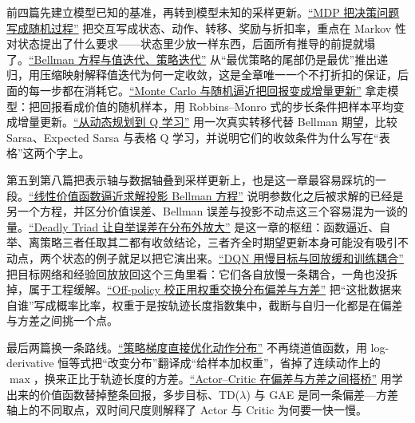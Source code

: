 前四篇先建立模型已知的基准，再转到模型未知的采样更新。\hyperref[sec:16-Control-and-Reinforcement-Learning/02-Reinforcement-Learning/01]{``MDP 把决策问题写成随机过程''} 把交互写成状态、动作、转移、奖励与折扣率，重点在 Markov 性对状态提出了什么要求——状态里少放一样东西，后面所有推导的前提就塌了。\hyperref[sec:16-Control-and-Reinforcement-Learning/02-Reinforcement-Learning/02]{``Bellman 方程与值迭代、策略迭代''} 从``最优策略的尾部仍是最优''推出递归，用压缩映射解释值迭代为何一定收敛，这是全章唯一一个不打折扣的保证，后面的每一步都在消耗它。\hyperref[sec:16-Control-and-Reinforcement-Learning/02-Reinforcement-Learning/03]{``Monte Carlo 与随机逼近把回报变成增量更新''} 拿走模型：把回报看成价值的随机样本，用 Robbins--Monro 式的步长条件把样本平均变成增量更新。\hyperref[sec:16-Control-and-Reinforcement-Learning/02-Reinforcement-Learning/04]{``从动态规划到 Q 学习''} 用一次真实转移代替 Bellman 期望，比较 Sarsa、Expected Sarsa 与表格 Q 学习，并说明它们的收敛条件为什么写在``表格''这两个字上。

第五到第八篇把表示轴与数据轴叠到采样更新上，也是这一章最容易踩坑的一段。\hyperref[sec:16-Control-and-Reinforcement-Learning/02-Reinforcement-Learning/05]{``线性价值函数逼近求解投影 Bellman 方程''} 说明参数化之后被求解的已经是另一个方程，并区分价值误差、Bellman 误差与投影不动点这三个容易混为一谈的量。\hyperref[sec:16-Control-and-Reinforcement-Learning/02-Reinforcement-Learning/06]{``Deadly Triad 让自举误差在分布外放大''} 是这一章的枢纽：函数逼近、自举、离策略三者任取其二都有收敛结论，三者齐全时期望更新本身可能没有吸引不动点，两个状态的例子就足以把它演出来。\hyperref[sec:16-Control-and-Reinforcement-Learning/02-Reinforcement-Learning/07]{``DQN 用慢目标与回放缓和训练耦合''} 把目标网络和经验回放放回这个三角里看：它们各自放慢一条耦合，一角也没拆掉，属于工程缓解。\hyperref[sec:16-Control-and-Reinforcement-Learning/02-Reinforcement-Learning/08]{``Off-policy 校正用权重交换分布偏差与方差''} 把``这批数据来自谁''写成概率比率，权重于是按轨迹长度指数集中，截断与自归一化都是在偏差与方差之间挑一个点。

最后两篇换一条路线。\hyperref[sec:16-Control-and-Reinforcement-Learning/02-Reinforcement-Learning/09]{``策略梯度直接优化动作分布''} 不再绕道值函数，用 log-derivative 恒等式把``改变分布''翻译成``给样本加权重''，省掉了连续动作上的 \(\max\)，换来正比于轨迹长度的方差。\hyperref[sec:16-Control-and-Reinforcement-Learning/02-Reinforcement-Learning/10]{``Actor--Critic 在偏差与方差之间搭桥''} 用学出来的价值函数替掉整条回报，多步目标、TD(\(\lambda\)) 与 GAE 是同一条偏差---方差轴上的不同取点，双时间尺度则解释了 Actor 与 Critic 为何要一快一慢。

